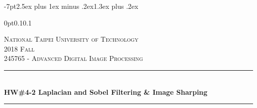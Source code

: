 \titlespacing*{\section} {-7pt}{2.5ex plus 1ex minus .2ex}{1.3ex plus .2ex}

\titlespacing*{\subsection}
{0pt}{0.1\baselineskip}{0.1\baselineskip}




\begin{titlepage} %
	\newcommand{\HRule}{\rule{\linewidth}{0.5mm}} %
		
	\center %
		
		
	\textsc{\LARGE National Taipei University of Technology}\\[1.5cm] %
		
	\textsc{\Large 2018 Fall}\\[0.5cm] %
		
	\textsc{\large 245765 - Advanced Digital Image Processing}\\[0.5cm] %
		
		
	\HRule\\[0.4cm]
		
	{\huge\bfseries HW\#4-2 Laplacian and Sobel Filtering \& Image Sharping}\\[0.4cm] %
		
	\HRule\\[1.5cm]
		

\end{titlepage}
